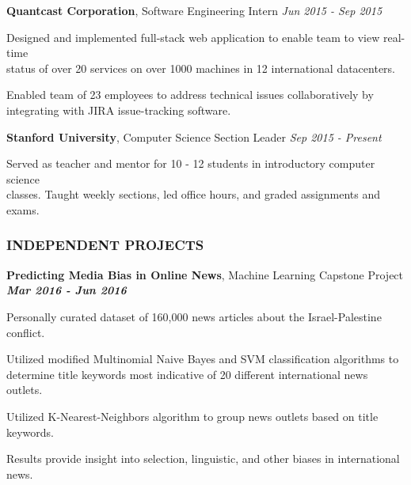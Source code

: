 \documentclass[11pt,letterpaper]{article}%
\begin{document}
\vspace{-.3em}
\hspace{.6em} 
{\bf Quantcast Corporation}, Software Engineering Intern \hfill \textit{Jun 2015 - Sep 2015}
\vspace{-.6em}
\begin{itemize*}
\item Designed and implemented full-stack web application to enable team to view real-time \\ status of over 20 services on over 1000 machines in 12 international datacenters. 
\item Enabled team of 23 employees to address technical issues collaboratively by \\ integrating with JIRA issue-tracking software.
\end{itemize*}

\vspace{-.3em}
\hspace{.6em} 
{\bf Stanford University}, Computer Science Section Leader \hfill \textit{Sep 2015 - Present}
\vspace{-.6em}
\begin{itemize*}
\item Served as teacher and mentor for 10 - 12 students in introductory computer science \\ classes. Taught weekly sections, led office hours, and graded assignments and exams.
\end{itemize*} 

\vspace{-1em}
\hrulefill 
\subsubsection*{INDEPENDENT PROJECTS}
\vspace{-1ex}
\hrulefill

\vspace{.3em}
\hspace{0.6em}
{\bf Predicting Media Bias in Online News}, Machine Learning Capstone Project \hfill \textbf{\textit{Mar 2016 - Jun 2016}}
\vspace{-.6em}
\begin{itemize*}
\item Personally curated dataset of 160,000 news articles about the Israel-Palestine conflict.
\item Utilized modified Multinomial Naive Bayes and SVM classification algorithms
to \\ determine title keywords most indicative of 20 different international news outlets.
\item Utilized K-Nearest-Neighbors algorithm to group news outlets based on title keywords.
\item Results provide insight into selection, linguistic, and other biases in international news.
\end{itemize*}
\end{document}
